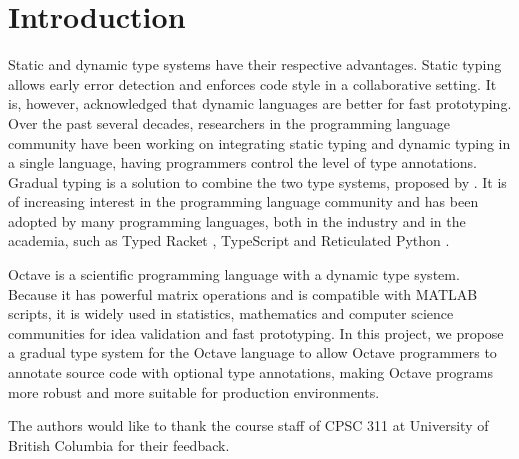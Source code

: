 \section{Introduction}
Static and dynamic type systems have their respective advantages. Static typing
allows early error detection and enforces code style in a collaborative setting.
It is, however, acknowledged that dynamic languages are better for fast
prototyping. Over the past several decades, researchers in the programming
language community have been working on integrating static typing and dynamic
typing in a single language, having programmers control the level of type
annotations. Gradual typing is a solution to combine the two type systems,
proposed by \cite{siek2006gradual}. It is of increasing interest in the
programming language community and has been adopted by many programming
languages, both in the industry and in the academia, such as Typed Racket
\cite{tobin2008design}, TypeScript \cite{bierman2014understanding} and
Reticulated Python \cite{vitousek2014design}.

Octave is a scientific programming language with a dynamic type system. Because
it has powerful matrix operations and is compatible with MATLAB scripts, it is
widely used in statistics, mathematics and computer science communities for idea
validation and fast prototyping. In this project, we propose a gradual type
system for the Octave language to allow Octave programmers to annotate source
code with optional type annotations, making Octave programs more robust and more
suitable for production environments.

\appendix

\begin{acks}
    The authors would like to thank the course staff of CPSC 311 at University
    of British Columbia for their feedback.
\end{acks}
